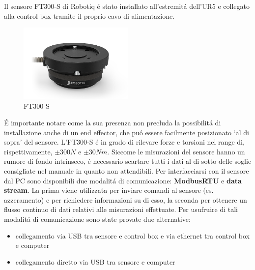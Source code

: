 Il sensore FT300-S di Robotiq \'{e} stato installato all'estremit\'{a} dell'UR5 e collegato alla control box tramite il proprio 
cavo di alimentazione. 
\begin{figure}[H]
    \centering
    \includegraphics*[width=0.5\textwidth]{images/ft.png}
    \caption{FT300-S}
    \label{fig:ft}
\end{figure}
\'{E} importante notare come la sua presenza non precluda la possibilit\'{a} di installazione anche di un end effector, 
che pu\'{o} essere facilmente posizionato `al di sopra' del sensore. 
L'FT300-S \'{e} in grado di rilevare forze e torsioni nel range di, rispettivamente, $\pm 300 N$ e $\pm 30 Nm$. 
Siccome le misurazioni del sensore hanno un rumore di fondo intrinseco, \'{e} necessario scartare tutti i dati al di sotto delle 
soglie consigliate nel manuale \cite{ft_sensor} in quanto non attendibili. 
Per interfacciarsi con il sensore dal PC sono disponibili due modalit\'{a} di comunicazione: \textbf{ModbusRTU} e \textbf{data stream}. 
La prima viene utilizzata per inviare comandi al sensore (es. azzeramento) e per richiedere informazioni su di esso, la seconda 
per ottenere un flusso continuo di dati relativi alle misurazioni effettuate. 
Per usufruire di tali modalit\'{a} di comunicazione sono state provate due alternative: 
\begin{itemize}
    \item collegamento via USB tra sensore e control box e via ethernet tra control box e computer
    \item collegamento diretto via USB tra sensore e computer
\end{itemize}

